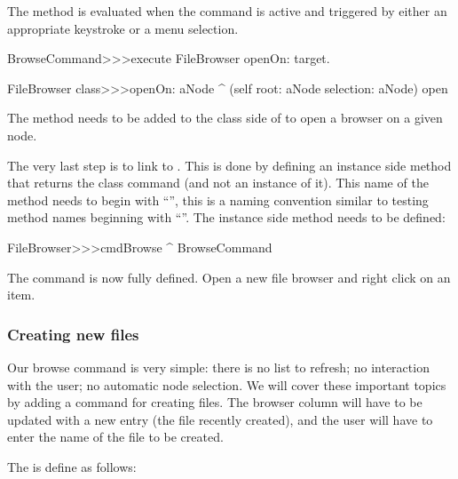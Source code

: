 \documentclass[a4paper,10pt,twoside]{book}
\begin{document}
The method  is evaluated when the command is active and triggered by either an appropriate keystroke or a menu selection.
\begin{code}{}    
BrowseCommand>>>execute
	FileBrowser openOn: target.

FileBrowser class>>>openOn: aNode 
	^ (self root: aNode selection: aNode) open
\end{code}

The method  needs to be added to the class side of  to open a browser on a given node. 

The very last step is to link  to . This is done by defining an instance side method that returns the class command (and not an instance of it). This name of the method needs to begin with ``'', this is a naming convention similar to testing method names beginning with ``''. The instance side method needs to be defined:

\begin{code}{}    
FileBrowser>>>cmdBrowse
	^ BrowseCommand
\end{code}

The command is now fully defined. Open a new file browser and right click on an item.

\subsubsection{Creating new files}

Our browse command is very simple: there is no list to refresh; no interaction with the user; no automatic node selection. We will cover these important topics by adding a command for creating files. The browser column will have to be updated with a new entry (the file recently created), and the user will have to enter the name of the file to be created.

The  is define as follows:

\end{document}
